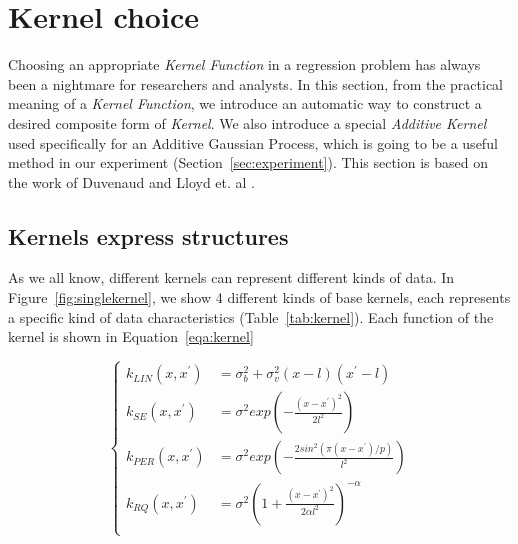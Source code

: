 \section{Kernel choice} \label{sec:kernel}
Choosing an appropriate \emph{Kernel Function} in a regression problem has always been a nightmare for researchers and analysts. In this section, from the practical meaning of a \emph{Kernel Function}, we introduce an automatic way to construct a desired composite form of \emph{Kernel}.
We also introduce a special \emph{Additive Kernel} used specifically for an Additive Gaussian Process, which is going to be a useful method in our experiment (Section~\ref{sec:experiment}).
This section is based on the work of Duvenaud and Lloyd et. al \cite{duvenaud2013structure,lloyd2014automatic,duvenaud2014automatic,duvenaud2011additive}.


\subsection{Kernels express structures}


As we all know, different kernels can represent different kinds of data. In Figure~\ref{fig:singlekernel}, we show 4 different kinds of base kernels, each represents a specific kind of data characteristics (Table~\ref{tab:kernel}). Each function of the kernel is shown in Equation~\ref{eqa:kernel}


\begin{equation}
\left \{
\begin{aligned} \label{eqa:kernel}
k_{LIN}(x,x^{'}) &= \sigma_{b}^{2} + \sigma_{v}^{2} (x-l)(x^{'}-l) 	\\
k_{SE}(x,x^{'}) &= \sigma^2 exp(-\frac{(x-x^{'})^2}{2l^2})	\\
k_{PER}(x,x^{'}) &= \sigma^2 exp(-\frac{2sin^2 (\pi(x-x^{'})/p)}{l^2})	\\
k_{RQ}(x,x^{'}) &= \sigma^2 (1+\frac{(x-x^{'})^2}{2\alpha l^2})^{-\alpha}	\\
\end{aligned}
\right.
\end{equation}


